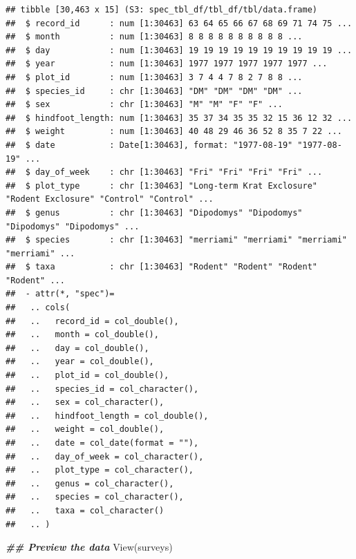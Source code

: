 \documentclass[
]{article}
\newenvironment{Shaded}{\begin{snugshade}}{\end{snugshade}}
\newcommand{\DocumentationTok}[1]{\textcolor[rgb]{0.56,0.35,0.01}{\textbf{\textit{#1}}}}
\newcommand{\FunctionTok}[1]{\textcolor[rgb]{0.00,0.00,0.00}{#1}}
\newcommand{\NormalTok}[1]{#1}
\begin{document}
\begin{verbatim}
## tibble [30,463 x 15] (S3: spec_tbl_df/tbl_df/tbl/data.frame)
##  $ record_id      : num [1:30463] 63 64 65 66 67 68 69 71 74 75 ...
##  $ month          : num [1:30463] 8 8 8 8 8 8 8 8 8 8 ...
##  $ day            : num [1:30463] 19 19 19 19 19 19 19 19 19 19 ...
##  $ year           : num [1:30463] 1977 1977 1977 1977 1977 ...
##  $ plot_id        : num [1:30463] 3 7 4 4 7 8 2 7 8 8 ...
##  $ species_id     : chr [1:30463] "DM" "DM" "DM" "DM" ...
##  $ sex            : chr [1:30463] "M" "M" "F" "F" ...
##  $ hindfoot_length: num [1:30463] 35 37 34 35 35 32 15 36 12 32 ...
##  $ weight         : num [1:30463] 40 48 29 46 36 52 8 35 7 22 ...
##  $ date           : Date[1:30463], format: "1977-08-19" "1977-08-19" ...
##  $ day_of_week    : chr [1:30463] "Fri" "Fri" "Fri" "Fri" ...
##  $ plot_type      : chr [1:30463] "Long-term Krat Exclosure" "Rodent Exclosure" "Control" "Control" ...
##  $ genus          : chr [1:30463] "Dipodomys" "Dipodomys" "Dipodomys" "Dipodomys" ...
##  $ species        : chr [1:30463] "merriami" "merriami" "merriami" "merriami" ...
##  $ taxa           : chr [1:30463] "Rodent" "Rodent" "Rodent" "Rodent" ...
##  - attr(*, "spec")=
##   .. cols(
##   ..   record_id = col_double(),
##   ..   month = col_double(),
##   ..   day = col_double(),
##   ..   year = col_double(),
##   ..   plot_id = col_double(),
##   ..   species_id = col_character(),
##   ..   sex = col_character(),
##   ..   hindfoot_length = col_double(),
##   ..   weight = col_double(),
##   ..   date = col_date(format = ""),
##   ..   day_of_week = col_character(),
##   ..   plot_type = col_character(),
##   ..   genus = col_character(),
##   ..   species = col_character(),
##   ..   taxa = col_character()
##   .. )
\end{verbatim}

\begin{Shaded}
\begin{Highlighting}[]
\DocumentationTok{\#\# Preview the data}
\FunctionTok{View}\NormalTok{(surveys)}
\end{Highlighting}
\end{Shaded}
\end{document}
